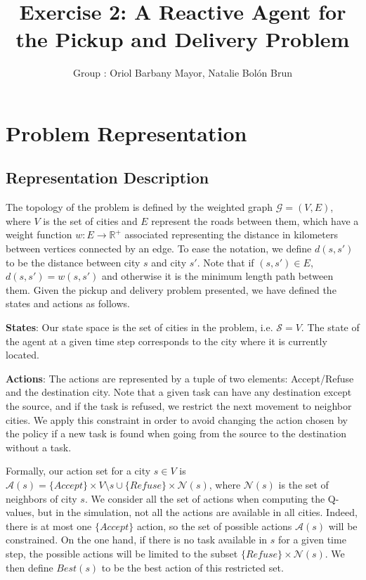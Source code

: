 \documentclass[11pt]{article}
\title{\bf Exercise 2: A Reactive Agent for the Pickup and Delivery Problem}
\author{Group \textnumero 54: Oriol Barbany Mayor, Natalie Bolón Brun}
\begin{document}
\maketitle

\section{Problem Representation}

\subsection{Representation Description}
The topology of the problem is defined by the weighted graph $\mathcal{G}=(V,E)$, where $V$ is the set of cities and $E$ represent the roads between them, which have a weight function $w:E\to \mathbb{R}^+$ associated representing the distance in kilometers between vertices connected by an edge. To ease the notation, we define $d(s,s')$ to be the distance between city $s$ and city $s'$. Note that if $(s,s')\in E$, $d(s,s')=w(s,s')$ and otherwise it is the minimum length path between them. Given the pickup and delivery problem presented, we have defined the states and actions as follows.
 
\textbf{States}: Our state space is the set of cities in the problem, i.e. $\mathcal{S} = V$. The state of the agent at a given time step corresponds to the city where it is currently located.

\textbf{Actions}: The actions are represented by a tuple of two elements: Accept/Refuse and the destination city. Note that a given task can have any destination except the source, and if the task is refused, we restrict the next movement to neighbor cities. We apply this constraint in order to avoid changing the action chosen by the policy if a new task is found when going from the source to the destination without a task.

Formally, our action set for a city $s\in V$ is $\mathcal{A}(s) = \{Accept\} \times V \setminus s \cup \{Refuse\} \times \mathcal{N}(s)$, where $\mathcal{N}(s)$ is the set of neighbors of city $s$. We consider all the set of actions when computing the Q-values, but in the simulation, not all the actions are available in all cities. Indeed, there is at most one $\{Accept\}$ action, so the set of possible actions $\mathcal{A}(s)$ will be constrained. On the one hand, if there is no task available in $s$ for a given time step, the possible actions will be limited to the subset $\{Refuse\} \times \mathcal{N}(s)$. We then define $Best(s)$ to be the best action of this restricted set. 
\end{document}

